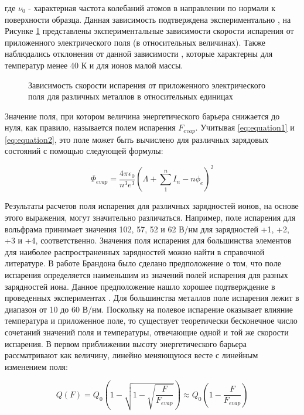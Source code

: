 где $\nu_0$ - характерная частота колебаний атомов в направлении по нормали к поверхности образца. Данная зависимость подтверждена экспериментально \cite{Kellogg81,Kellogg84}, на Рисунке \cref{fig:evapspeed} представлены экспериментальные зависимости скорости испарения от приложенного электрического поля (в относительных величинах). Также наблюдались отклонения от данной зависимости \cite{Gomer84,Wada84}, которые характерны для температур менее 40 К и для ионов малой массы.

\begin{figure}[ht]
	\caption{Зависимость скорости испарения от приложенного электрического поля для различных металлов в относительных единицах\cite{Tsong78}}
	\label{fig:evapspeed}
\end{figure} 

Значение поля, при котором величина энергетического барьера снижается до нуля, как правило, называется полем испарения $F_{evap}$. Учитывая \cref{eq:equation1} и \cref{eq:equation2}, это поле может быть вычислено для различных зарядовых состояний с помощью следующей формулы: 

\begin{equation}
	\label{eq:equation5}
	\Phi_{evap} = \frac{4\pi\epsilon_0}{n^3 e^3}(\Lambda + \sum_{1}^{n} I_n - n\phi_e)^2
\end{equation}

Результаты расчетов поля испарения для различных зарядностей ионов, на основе этого выражения, могут значительно различаться. Например, поле испарения для вольфрама принимает значения 102, 57, 52 и 62 В/нм для зарядностей +1, +2, +3 и +4, соответственно. Значения поля испарения для большинства элементов для наиболее распространенных зарядностей можно найти в справочной литературе. В работе Брандона \cite{Brandon65} было сделано предположение о том, что поле испарения определяется наименьшим из значений полей испарения для разных зарядностей иона. Данное предположение нашло хорошее подтверждение в проведенных экспериментах \cite{Tsong782}. Для большинства металлов поле испарения лежит в диапазон от 10 до 60 В/нм.
Поскольку на полевое испарение оказывает влияние температура и приложенное поле, то существует теоретически бесконечное число сочетаний значений поля и температуры, отвечающие одной и той же скорости испарения. В первом приближении высоту энергетического барьера рассматривают как величину, линейно меняющуюся весте с линейным изменением поля:
 
\begin{equation}
	\label{eq:equation6}
	Q(F) = Q_0(1 - \sqrt{1 - \sqrt{\frac{F}{F_{evap}}}}) \approx Q_0 (1 - \frac{F}{F_{evap}})
\end{equation}

